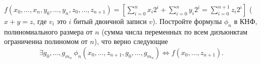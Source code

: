 $f(x_0, \dotsc, x_{n}, y_{0}, \dotsc, y_{n}, z_{0}, \dotsc, z_{n + 1}) = [ \sum\limits_{i = 0}^{n} x_i 2^{i} +
\sum\limits_{i = 0}^{n} y_{i} 2^{i} = \sum\limits_{i = 0}^{n + 1} z_{i} 2^{i} ]$ ($x + y = z$, где $v_i$ это $i$ битый
двоичной записи $v$). Постройте формулы $\phi_n$ в КНФ, полиномиального размера от $n$ (сумма числа переменных по всем
дизъюнктам ограниченна полиномом от $n$), что верно следующие $$\exists{g_0, \dotsc, g_{m_n}}~\phi_n(x_{0}, \dotsc,
z_{n + 1}, g_{0}, \dotsc, g_{m_n}) \iff f(x_{0}, \dotsc, z_{n + 1}).$$